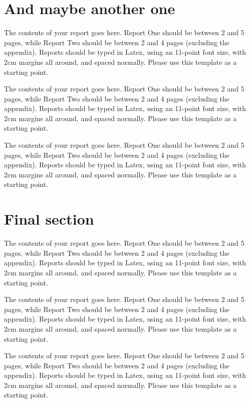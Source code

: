 \documentclass[a4paper,11pt]{article}
\begin{document}
\section{And maybe another one}

The contents of your report goes here.  Report One should be between 2
and 5 pages, while Report Two should be between 2 and 4 pages
(excluding the appendix).  Reports should be typed in Latex, using an
11-point font size, with 2cm margins all around, and spaced normally.
Please use this template as a starting point.

The contents of your report goes here.  Report One should be between 2
and 5 pages, while Report Two should be between 2 and 4 pages
(excluding the appendix).  Reports should be typed in Latex, using an
11-point font size, with 2cm margins all around, and spaced normally.
Please use this template as a starting point.

The contents of your report goes here.  Report One should be between 2
and 5 pages, while Report Two should be between 2 and 4 pages
(excluding the appendix).  Reports should be typed in Latex, using an
11-point font size, with 2cm margins all around, and spaced normally.
Please use this template as a starting point.


\section{Final section}

The contents of your report goes here.  Report One should be between 2
and 5 pages, while Report Two should be between 2 and 4 pages
(excluding the appendix).  Reports should be typed in Latex, using an
11-point font size, with 2cm margins all around, and spaced normally.
Please use this template as a starting point.

The contents of your report goes here.  Report One should be between 2
and 5 pages, while Report Two should be between 2 and 4 pages
(excluding the appendix).  Reports should be typed in Latex, using an
11-point font size, with 2cm margins all around, and spaced normally.
Please use this template as a starting point.

The contents of your report goes here.  Report One should be between 2
and 5 pages, while Report Two should be between 2 and 4 pages
(excluding the appendix).  Reports should be typed in Latex, using an
11-point font size, with 2cm margins all around, and spaced normally.
Please use this template as a starting point.

{}

\end{document}

